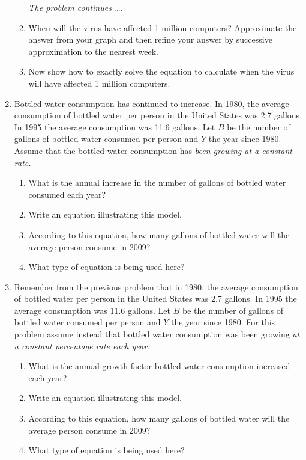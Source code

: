 \documentclass[12pt]{article}
\begin{document}
\begin{enumerate}
\begin{enumerate}
\newpage
\hspace{-.5 in}\emph{The problem continues \ldots.}

\item When will the virus have affected 1 million computers?  Approximate the answer from your graph and then refine your answer by successive approximation to the nearest week.
\vfill
\item Now show how to exactly solve the equation to calculate when the virus will have affected 1 million computers.
\vfill
\end{enumerate}




\newpage

\item Bottled water consumption has continued to increase.  In 1980, the average consumption of bottled water per person in the United States was 2.7 gallons.  In 1995 the average consumption was 11.6 gallons.  Let $B$ be the number of gallons of bottled water consumed per person and $Y$ the year since 1980.  Assume that the bottled water consumption has \textit{been growing at a constant rate.}

\begin{enumerate}
\item What is the annual increase in the number of gallons of bottled water consumed each year?
\vfill
\item Write an equation illustrating this model.
\vfill
\item According to this equation, how many gallons of bottled water will the average person consume in 2009?
\vfill
\item What type of equation is being used here?
\vfill
\end{enumerate}

\newpage

\item  Remember from the previous problem that in 1980, the average consumption of bottled water per person in the United States was 2.7 gallons.  In 1995 the average consumption was 11.6 gallons.  Let $B$ be the number of gallons of bottled water consumed per person and $Y$ the year since 1980.  For this problem assume instead that bottled water consumption was been growing \textit{at a constant percentage rate each year}.

\begin{enumerate}
\item What is the annual growth factor bottled water consumption increased each year?
\vfill
\item Write an equation illustrating this model.
\vfill
\item According to this equation, how many gallons of bottled water will the average person consume in 2009?
\vfill
\item What type of equation is being used here?
\vfill
\end{enumerate}





\end{enumerate}
\end{document}
